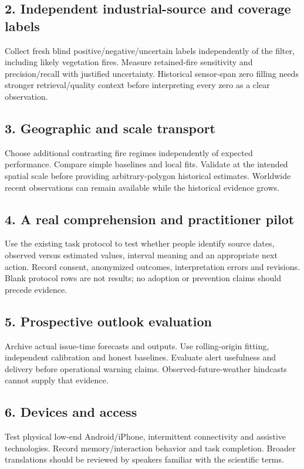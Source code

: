 \subsection{2. Independent industrial-source and coverage labels}
Collect fresh blind positive/negative/uncertain labels independently of the filter, including likely vegetation fires. Measure retained-fire sensitivity and precision/recall with justified uncertainty. Historical sensor-span zero filling needs stronger retrieval/quality context before interpreting every zero as a clear observation.

\subsection{3. Geographic and scale transport}
Choose additional contrasting fire regimes independently of expected performance. Compare simple baselines and local fits. Validate at the intended spatial scale before providing arbitrary-polygon historical estimates. Worldwide recent observations can remain available while the historical evidence grows.

\subsection{4. A real comprehension and practitioner pilot}
Use the existing task protocol to test whether people identify source dates, observed versus estimated values, interval meaning and an appropriate next action. Record consent, anonymized outcomes, interpretation errors and revisions. Blank protocol rows are not results; no adoption or prevention claims should precede evidence.

\subsection{5. Prospective outlook evaluation}
Archive actual issue-time forecasts and outputs. Use rolling-origin fitting, independent calibration and honest baselines. Evaluate alert usefulness and delivery before operational warning claims. Observed-future-weather hindcasts cannot supply that evidence.

\subsection{6. Devices and access}
Test physical low-end Android/iPhone, intermittent connectivity and assistive technologies. Record memory/interaction behavior and task completion. Broader translations should be reviewed by speakers familiar with the scientific terms.

